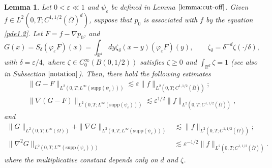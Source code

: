 \documentclass[13pt,CJK]{article}
\theoremstyle{plain}                       %
\newtheorem{lemma}{Lemma}[section]
\theoremstyle{remark}
\numberwithin{equation}{section}
\begin{document}
\begin{lemma}\label{lemma3.2}
Let $0<\varepsilon\ll 1$ and $\psi_\varepsilon$ be defined in Lemma $\ref{lemma:cut-off}$.
Given $f\in L^2(0,T;C^{1,1/2}(\bar{\Omega})^d)$, suppose that
$p_0$ is associated with $f$ by the equation \eqref{pde1.2}.
Let $F=f-\nabla p_0$, and
\begin{equation*}
G(x)=S_{\delta}(\varphi_\varepsilon F)(x) = \int_{\mathbb{R}^d}
dy\zeta_\delta(x-y)(\varphi_\varepsilon F)(y),
\qquad \zeta_\delta = \delta^{-d}\zeta(\cdot/\delta),
\end{equation*}
with $\delta = \varepsilon/4$, where $\zeta\in C_0^\infty(B(0,1/2))$
satisfies $\zeta\geq 0$ and $\int_{\mathbb{R}^d}\zeta =1$
(see also in Subsection $\ref{notation}$).
Then, there hold the following estimates
\begin{equation}\label{pde3.1}
\begin{aligned}
\|G-F\|_{L^2(0,T;
L^{\infty}(\text{supp}(\psi_{\varepsilon})))}
\lesssim \varepsilon
\|f\|_{L^2(0,T;C^{1,1/2}(\bar{\Omega}))};\\
\|\nabla(G-F)\|_{
L^2(0,T;L^{\infty}(\text{supp}(\psi_{\varepsilon})))}
\lesssim \varepsilon^{1/2}
\|f\|_{L^2(0,T;C^{1,1/2}(\bar{\Omega}))},
\end{aligned}
\end{equation}
and
\begin{equation}\label{pde3.4}
\begin{aligned}
\|G\|_{L^{2}(0,T;L^{\infty}(\Omega))}+
\|\nabla G\|_{L^{2}(0,T;L^{\infty}
(\text{supp}(\psi_{\varepsilon})))}
&\lesssim\|f\|_{L^{2}(0,T;C^{1,1/2}
(\bar{\Omega}))};\\
\|\nabla^2 G\|_{L^2(0,T;L^{\infty}(\text{supp}(\psi_{\varepsilon})))}
&\lesssim\varepsilon^{-1/2}\|f\|_{L^{2}(0,T;C^{1,1/2}
(\bar{\Omega}))}.
\end{aligned}
\end{equation}
where the multiplicative constant depends only on $d$ and $\zeta$.
\end{lemma}
\end{document}
